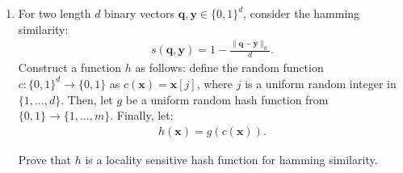 \documentclass[10pt]{article}
\newcommand{\bv}[1]{\mathbf{#1}}
\newcommand{\E}{\mathbb{E}}
\begin{document}
\begin{enumerate}

\item For two length $d$ binary vectors $\bv{q},\bv{y} \in \{0,1\}^d$, consider the hamming similarity: 
\begin{align*}
	s(\bv{q},\bv{y}) = 1 - \frac{\|\bv{q} - \bv{y}\|_0}{d}.
\end{align*} 
Construct a function $h$ as follows:
	define the random function $c: \{0,1\}^d \rightarrow \{0,1\}$ as $c(\bv{x}) = \bv{x}[j]$, where $j$ is a uniform random integer in $\{1, \ldots, d\}$. Then, let $g$ be a uniform random hash function from $\{0,1\} \rightarrow \{1, \ldots, m\}$. Finally, let:
	\begin{align*}
		h(\bv{x}) = g(c(\bv{x})).
	\end{align*}
	
	 Prove that $h$ is a locality sensitive hash function for {hamming similarity}. 
	\end{enumerate}
	
	
	
	
\end{document}
